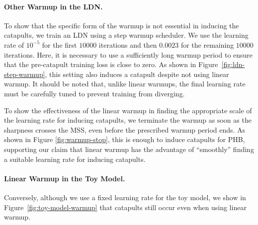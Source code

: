 \paragraph{Other Warmup in the LDN.}
To show that the specific form of the warmup is not essential in inducing the catapults, we train an LDN using a step warmup scheduler.
We use the learning rate of $10^{-5}$ for the first $10000$ iterations and then $0.0023$ for the remaining $10000$ iterations. Here, it is necessary to use a sufficiently long warmup period to ensure that the pre-catapult training loss is close to zero. 
As shown in Figure~\ref{fig:ldn-step-warmup}, this setting also induces a catapult despite not using linear warmup.
It should be noted that, unlike linear warmups, the final learning rate must be carefully tuned to prevent training from diverging. 

To show the effectiveness of the linear warmup in finding the appropriate scale of the learning rate for inducing catapults, we terminate the warmup as soon as the sharpness crosses the MSS, even before the prescribed warmup period ends.
As shown in Figure \ref{fig:warmup-stop}, this is enough to induce catapults for PHB, supporting our claim that linear warmup has the advantage of ``smoothly'' finding a suitable learning rate for inducing catapults.

\paragraph{Linear Warmup in the Toy Model.}
Conversely, although we use a fixed learning rate for the toy model, we show in Figure~\ref{fig:toy-model-warmup} that catapults still occur even when using linear warmup.

